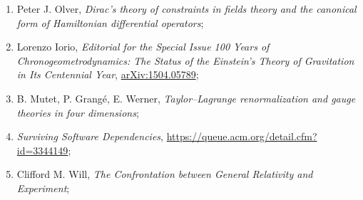 \documentclass[a4paper,11pt]{article}
\begin{document}
\begin{enumerate}
\item Peter J. Olver, \emph{Dirac’s theory of constraints in fields
    theory and the canonical form of Hamiltonian differential
    operators};


\item Lorenzo Iorio, \emph{Editorial for the Special Issue 100 Years of Chronogeometrodynamics: The Status of the Einstein's Theory of Gravitation in Its Centennial Year}, \href{https://arxiv.org/abs/1504.05789v2}{arXiv:1504.05789};

\item B. Mutet, P. Grang\'{e}, E. Werner, \emph{Taylor–Lagrange renormalization and gauge theories
in four dimensions};


\item \emph{Surviving Software Dependencies},
  \href{https://queue.acm.org/detail.cfm?id=3344149}{https://queue.acm.org/detail.cfm?id=3344149};

\item Clifford M. Will, \emph{The Confrontation between General Relativity
and Experiment};































































\end{enumerate}











\end{document}
